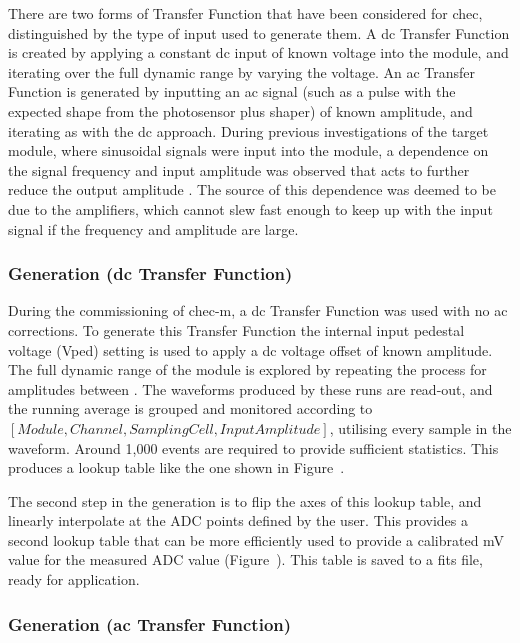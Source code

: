 There are two forms of Transfer Function that have been considered for \gls{chec}, distinguished by the type of input used to generate them. A \gls{dc} Transfer Function is created by applying a constant \gls{dc} input of known voltage into the module, and iterating over the full dynamic range by varying the voltage. An \gls{ac} Transfer Function is generated by inputting an \gls{ac} signal (such as a pulse with the expected shape from the photosensor plus shaper) of known amplitude, and iterating as with the \gls{dc} approach. During previous  investigations of the \gls{target} module, where sinusoidal signals were input into the module, a dependence on the signal frequency and input amplitude was observed that acts to further reduce the output amplitude \cite{Bechtol2012}\cite{Albert2017}. The source of this dependence was deemed to be due to the amplifiers, which cannot slew fast enough to keep up with the input
signal if the frequency and amplitude are large. 

\subsubsection{Generation (\gls{dc} Transfer Function)}

During the commissioning of \gls{chec-m}, a \gls{dc} Transfer Function was used with no \gls{ac} corrections. To generate this Transfer Function the internal input pedestal voltage (Vped) setting is used to apply a \gls{dc} voltage offset of known amplitude. The full dynamic range of the module is explored by repeating the process for amplitudes between . The waveforms produced by these runs are read-out, and the running average is grouped and monitored according to $[Module, Channel, Sampling Cell, Input Amplitude]$, utilising every sample in the waveform. Around 1,000 events are required to provide sufficient statistics. This produces a lookup table like the one shown in Figure~.

The second step in the generation is to flip the axes of this lookup table, and linearly interpolate at the ADC points defined by the user. This provides a second lookup table that can be more efficiently used to provide a calibrated mV value for the measured ADC value (Figure~). This table is saved to a \gls{fits} file, ready for application.

\subsubsection{Generation (\gls{ac} Transfer Function)}

